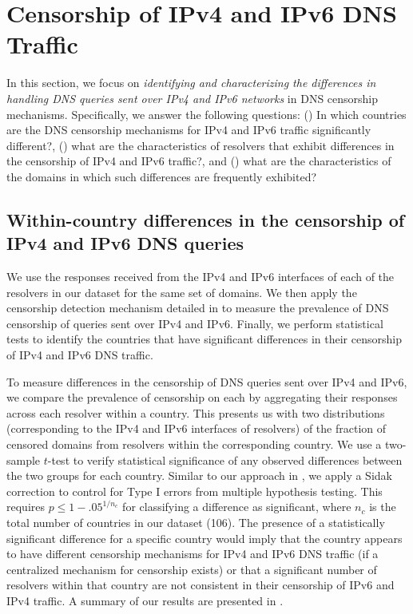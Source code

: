 \section{Censorship of IPv4 and IPv6 DNS Traffic}
\label{sec:infrastructure}

 In this section, we focus on {\it identifying and
characterizing the differences in handling DNS queries sent over IPv4 and IPv6
networks} in DNS censorship mechanisms. 
%
Specifically, we answer the following questions:
%
() In which countries are the DNS censorship
mechanisms for IPv4 and IPv6 traffic significantly different?,
%
() what are the characteristics of resolvers
that exhibit differences in the censorship of IPv4 and IPv6 traffic?, and
%
() what are the characteristics of the domains
in which such differences are frequently exhibited?

\subsection{Within-country differences in the censorship of IPv4 and IPv6 DNS
queries} \label{sec:infrastructure:country}

We use the responses received from the IPv4 and IPv6 interfaces of each of the
resolvers in our dataset for the same set of domains. We then apply
the censorship detection mechanism detailed in  to
measure the prevalence of DNS censorship of queries sent over IPv4 and IPv6.
Finally, we perform statistical tests to identify the countries that have
significant differences in their censorship of IPv4 and IPv6 DNS traffic.

To measure differences in the censorship of DNS queries sent over IPv4 and
IPv6, we compare the prevalence of censorship on each by aggregating their
responses across each resolver within a country. This presents us with two
distributions (corresponding to the IPv4 and IPv6 interfaces of resolvers) of
the fraction of censored domains from resolvers within the corresponding
country.
%
We use a two-sample $t$-test to verify statistical significance of any observed
differences between the two groups for each country. Similar to our approach in
, we apply a Sidak correction to control for Type I errors
from multiple hypothesis testing. 
%
This requires $p \leq 1-{.05}^{1/n_{c}}$ for classifying a difference as
significant, where $n_c$ is the total number of countries in our dataset
(106). 
%
The presence of a statistically significant difference for a specific country
would imply that the country appears to have different censorship mechanisms
for IPv4 and IPv6 DNS traffic (if a centralized mechanism for censorship
exists) or that a significant number of resolvers within that country are not
consistent in their censorship of IPv6 and IPv4 traffic.
%
A summary of our results are presented in .

